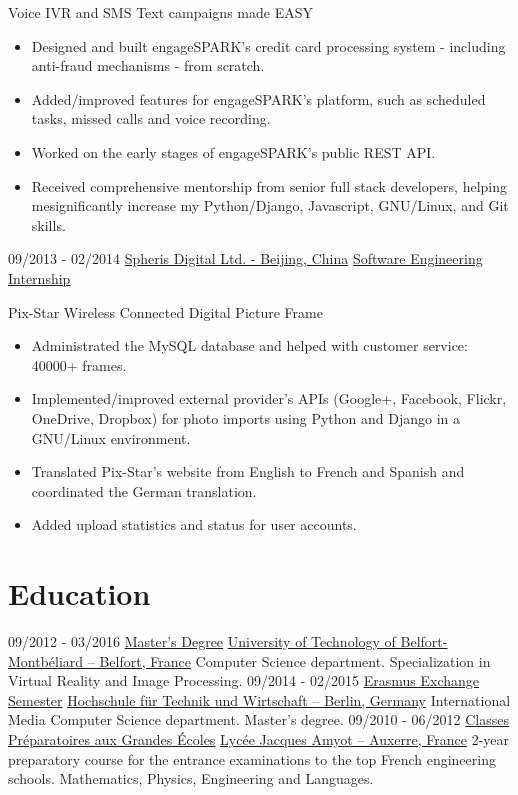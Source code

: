 \documentclass[]{friggeri-cv}
\begin{document}
\begin{entrylist}
    {Voice IVR and SMS Text campaigns made EASY \\
      \begin{itemize}
        \item Designed and built engageSPARK’s credit card processing system - including anti-fraud mechanisms - from scratch.
        \item Added/improved features for engageSPARK’s platform, such as scheduled tasks, missed calls and voice recording.
	\item Worked on the early stages of engageSPARK’s public REST API.
	\item Received comprehensive mentorship from senior full stack developers, helping mesignificantly increase my Python/Django, Javascript, GNU/Linux, and Git skills.
      \end{itemize}
    }
  \entry
    {09/2013 - 02/2014}
    {\href{https://www.pix-star.com/}{Spheris Digital Ltd. - Beijing, China}}
    {\href{https://www.pix-star.com/}{Software Engineering Internship}}
    {Pix-Star Wireless Connected Digital Picture Frame \\
      \begin{itemize}
        \item Administrated the MySQL database and helped with customer service: 40000+ frames. 
        \item Implemented/improved external provider’s APIs (Google+, Facebook, Flickr, OneDrive, Dropbox) for photo imports using Python and Django in a GNU/Linux environment. 
        \item Translated Pix-Star’s website from English to French and Spanish and coordinated the German translation.
        \item Added upload statistics and status for user accounts.
      \end{itemize}
    }  
\end{entrylist}

\section{Education}
\begin{entrylist}
  \entry
    {09/2012 - 03/2016}
    {\href{http://www.utbm.fr/}{Master's Degree}}
    {\href{http://www.utbm.fr/}{University of Technology of Belfort-Montbéliard – Belfort, France}}
    {Computer Science department. Specialization in Virtual Reality and Image Processing.}
  \entry
    {09/2014 - 02/2015}
    {\href{https://www.htw-berlin.de/}{Erasmus Exchange Semester}}
    {\href{https://www.htw-berlin.de/}{Hochschule für Technik und Wirtschaft – Berlin, Germany}}
    {International Media Computer Science department. Master’s degree.}
  \entry
    {09/2010 - 06/2012}
    {\href{http://lyc89-amyot.ac-dijon.fr/category/la-prepa/}{Classes Préparatoires aux Grandes Écoles}}
    {\href{http://lyc89-amyot.ac-dijon.fr/category/la-prepa/}{Lycée Jacques Amyot – Auxerre, France}}
    {2-year preparatory course for the entrance examinations to the top French engineering schools. Mathematics, Physics, Engineering and Languages.}
\end{entrylist}
\end{document}
